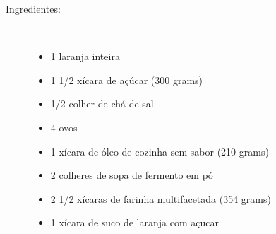 \documentclass [11pt, letterpaper] {article}
\begin{document}
\begin {description}

\item [Ingredientes:] \ \\
\begin {itemize}
\item 1 laranja inteira
\item 1 1/2 xícara de açúcar (300 grams)
\item 1/2 colher de chá de sal
\item 4 ovos
\item 1 xícara de óleo de cozinha sem sabor (210 grams)
\item 2 colheres de sopa de fermento em pó
\item 2 1/2 xícaras de farinha multifacetada (354 grams)
\item 1 xícara de suco de laranja com açucar
\end {itemize}



\end{description}
\end{document}
